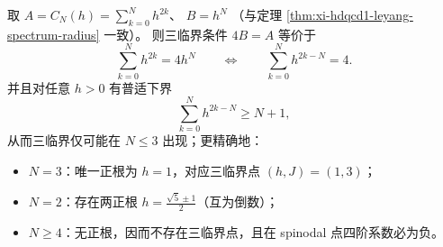 \begin{theorem}
\begin{enumerate}
  取
  \(
  A=C_N(h)=\sum_{k=0}^{N}h^{2k}
  \)、
  \(
  B=h^{N}
  \)
  （与定理 \ref{thm:xi-hdqcd1-leyang-spectrum-radius} 一致）。
  则三临界条件 \(4B=A\) 等价于
  \begin{equation}\label{eq:xi-hdqcd-cw-tricritical-eq}
  \sum_{k=0}^{N}h^{2k}=4h^{N}
  \qquad\Longleftrightarrow\qquad
  \sum_{k=0}^{N}h^{2k-N}=4.
  \end{equation}
  并且对任意 \(h>0\) 有普适下界
  \begin{equation}\label{eq:xi-hdqcd-cw-universal-lb}
  \sum_{k=0}^{N}h^{2k-N}\ge N+1,
  \end{equation}
  从而三临界仅可能在 \(N\le 3\) 出现；更精确地：
  \begin{itemize}
    \item \(N=3\)：唯一正根为 \(h=1\)，对应三临界点 \((h,J)=(1,3)\)；
    \item \(N=2\)：存在两正根 \(h=\frac{\sqrt5\pm 1}{2}\)（互为倒数）；
    \item \(N\ge 4\)：无正根，因而不存在三临界点，且在 spinodal 点四阶系数必为负。
  \end{itemize}
\end{enumerate}
\end{theorem}

